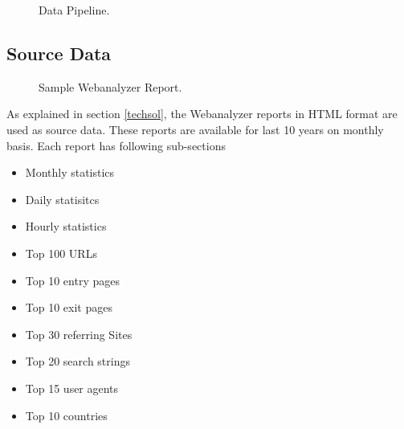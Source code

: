 \begin{figure}[datapipeline]
\centering
{}
\caption{Data Pipeline.}
\label{fig:datapipeline}
\end{figure}


\subsection{Source Data} \label{sourcedata}
\begin{figure}[samplewebanalyzer]
\centering
{}
\caption{Sample Webanalyzer Report.}
\label{fig:samplewebanalyzer}
\end{figure}

As explained in section \ref{techsol}, the Webanalyzer reports in HTML format
are used as source data. These reports are available for last 10 years on
monthly basis. Each report has following sub-sections
 \begin{itemize}
 \item Monthly statistics
 \item Daily statisitcs
 \item Hourly statistics
 \item Top 100 URLs
 \item Top 10 entry pages
 \item Top 10 exit pages
 \item Top 30 referring Sites
 \item Top 20 search strings
 \item Top 15 user agents
 \item Top 10 countries
 \end{itemize}

